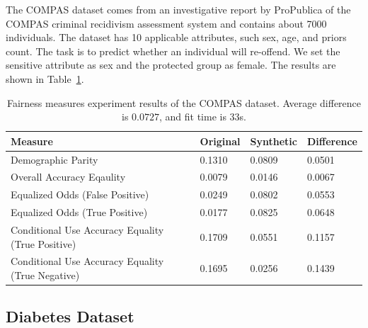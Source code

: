\documentclass[manuscript,screen,review,anonymous]{acmart}
\begin{document}
The COMPAS\cite{larson2016propublica,Kaggle_COMPAS_Dataset} dataset comes from an investigative report by ProPublica of the COMPAS criminal recidivism assessment system and contains about 7000 individuals. The dataset has 10 applicable attributes, such sex, age, and priors count. The task is to predict whether an individual will re-offend. We set the sensitive attribute as sex and the protected group as female. The results are shown in Table~\ref{tab:compas_score}.



\begin{table}[h]
\caption{
    Fairness measures experiment results of the COMPAS dataset.
    Average difference is $0.0727$, and fit time is 33s.
}
\label{tab:compas_score}
\begin{tabular}{llll}
\toprule
\textbf{Measure} & \textbf{Original} & \textbf{Synthetic} & \textbf{Difference} \\
\midrule
Demographic Parity  & 0.1310 & 0.0809 & 0.0501 \\
Overall Accuracy Eqaulity   & 0.0079 & 0.0146 & 0.0067 \\
Equalized Odds (False Positive)    & 0.0249 & 0.0802 & 0.0553 \\
Equalized Odds (True Positive)    & 0.0177 & 0.0825 & 0.0648 \\
Conditional Use Accuracy Equality (True Positive) & 0.1709 & 0.0551 & 0.1157 \\
Conditional Use Accuracy Equality (True Negative) & 0.1695 & 0.0256 & 0.1439 \\
\bottomrule
\end{tabular}
\end{table}

\subsection{Diabetes Dataset}
\end{document}
